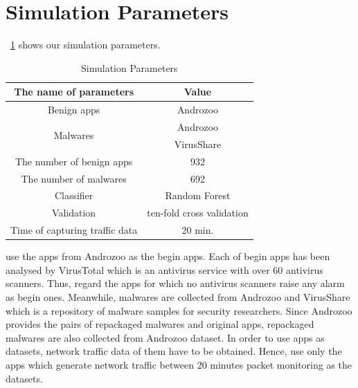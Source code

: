 \section{Simulation Parameters}
\tablename~\ref{tab:simulation_parameters} shows our simulation parameters.  
\begin{table}[p]
	\begin{center}
		\caption{Simulation Parameters}
		\label{tab:simulation_parameters} 
		\begin{tabular}{|c|c|c|} \hline
			The name of parameters & \multicolumn{2}{|c|}{Value}\\ \hline \hline
			Benign apps & \multicolumn{2}{|c|}{Androzoo\cite{allix2016androzoo}}\\ \hline
			\multirow{2}{*}{\hfill Malwares  \hfill} & \multicolumn{2}{|c|}{Androzoo} \\ 
																							 & \multicolumn{2}{|c|}{VirusShare\cite{virusshare}} \\ \hline
			The number of benign apps  & \multicolumn{2}{|c|}{932} \\  \hline
			The number of malwares  &  \multicolumn{2}{|c|}{692} \\ \hline
			Classifier & \multicolumn{2}{|c|}{Random Forest \cite{breiman2001random}} \\ \hline
      Validation & \multicolumn{2}{|c|}{ten-fold cross validation \cite{kohavi1995study}} \\ \hline
			Time of capturing traffic data  & \multicolumn{2}{|c|}{20 min.} \\ \hline
		\end{tabular}
	\end{center}
\end{table} 
\We use the apps from Androzoo \cite{allix2016androzoo} as the begin apps.
Each of begin apps has been analysed by VirusTotal \cite{virustotal} which is an antivirus service with over 60 antivirus scanners.
Thus, \we regard the apps for which no antivirus scanners raise any alarm as begin ones.
Meanwhile, malwares are collected from Androzoo and VirusShare \cite{virusshare} which is a repository of malware samples for security researchers.
Since Androzoo provides the pairs of repackaged malwares and original apps, repackaged malwares are also collected from Androzoo dataset.
In order to use apps as \our datasets, network traffic data of them have to be obtained.
Hence, \we use only the apps which generate network traffic between 20 minutes packet monitoring as the \our datasets.

